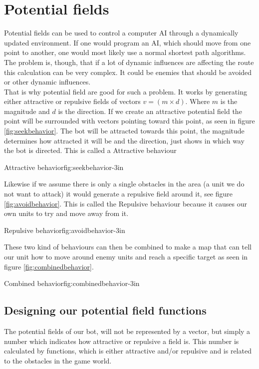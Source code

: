\section{Potential fields}
	Potential fields can be used to control a computer AI through a dynamically updated environment. 
	If one would program an AI, which should move from one point to another, one would most likely use a normal shortest path algorithms. 
	The problem is, though, that if a lot of dynamic influences are affecting the route this calculation can be very complex. It could be 
	enemies that should be avoided or other dynamic influences. \\
	
	That is why potential field are good for such a problem. It works by generating either attractive or repulsive fields of vectors $v=(m\times d )$. 
	Where $m$ is the magnitude and $d$ is the direction. 
	If we create an attractive potential field the point will be surrounded with vectors pointing toward this point, 
	as seen in figure \ref{fig:seekbehavior}. 
	The bot will be attracted towards this point, the magnitude determines how attracted it will be and the direction, 
	just shows in which way the bot is directed. This is called a Attractive behaviour 
	
		{Attractive behavior\cite{pft}}{fig:seekbehavior}{-3in}
	
	Likewise if we assume there is only a single obstacles in the area (a unit we do not want to attack) it would generate a repulsive field around it, 
	see figure \ref{fig:avoidbehavior}. This is called the Repulsive behaviour because it causes our own units to try and move away from it.

		{Repulsive behavior\cite{pft}}{fig:avoidbehavior}{-3in}
		
	These two kind of behaviours can then be combined to make a map that can tell our unit 
	how to move around enemy units and reach a specific target as seen in figure \ref{fig:combinedbehavior}.
	
		{Combined behavior\cite{pft}}{fig:combinedbehavior}{-3in}
		
	\subsection{Designing our potential field functions}		
		The potential fields of our bot, will not be represented by a vector, but simply a number which indicates how attractive or repulsive a field is. 
		This number is calculated by functions, which is either attractive and/or repulsive and is related to the obstacles in the game world. 
		
